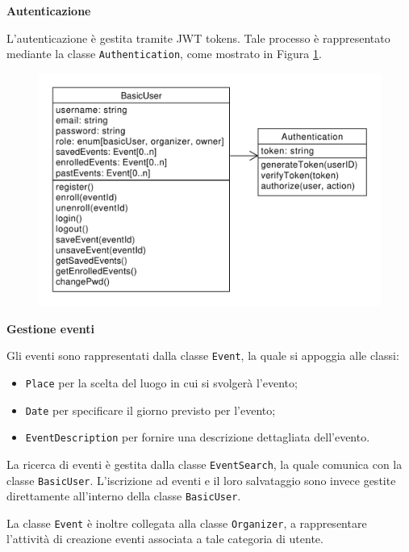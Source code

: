 \documentclass[9pt]{extarticle}
\begin{document}
\newpage

\textbf{Autenticazione}

L'autenticazione è gestita tramite JWT tokens. Tale processo è rappresentato mediante la classe \verb*|Authentication|, come mostrato in Figura \ref{fig:classDiagramAuthentication}.


\begin{figure}[!htb]
	\centering
	\includegraphics[width=.8\linewidth]{./images/classDiagramAuthentication.pdf}
	\caption{}
	\label{fig:classDiagramAuthentication}
\end{figure}

\textbf{Gestione eventi}

Gli eventi sono rappresentati dalla classe \verb*|Event|, la quale si appoggia alle classi:
\begin{itemize}
	\item \verb*|Place| per la scelta del luogo in cui si svolgerà l'evento;
	\item \verb*|Date| per specificare il giorno previsto per l'evento;
	\item \verb*|EventDescription| per fornire una descrizione dettagliata dell'evento.
\end{itemize}

La ricerca di eventi è gestita dalla classe \verb*|EventSearch|, la quale comunica con la classe \verb*|BasicUser|. L'iscrizione ad eventi e il loro salvataggio sono invece gestite direttamente all'interno della classe \verb*|BasicUser|.

La classe \verb*|Event| è inoltre collegata alla classe \verb*|Organizer|, a rappresentare l'attività di creazione eventi associata a tale categoria di utente.

\newpage
\end{document}
